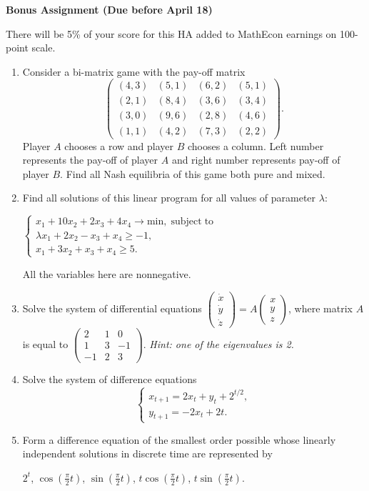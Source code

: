 \documentclass{article}
\begin{document}
\fontsize{14}{21}
\selectfont
\centerline{\textbf{Bonus Assignment (Due before April 18)}}
\fontsize{12}{18}
\selectfont

There will be 5\% of your score for this HA added to MathEcon earnings on 100-point scale.

\medskip

\begin{enumerate}
\item Consider a bi-matrix game with the pay-off matrix
$$
\begin{pmatrix}
(4,3) & (5,1) & (6,2) & (5,1)\\
(2,1) & (8,4) & (3,6) & (3,4)\\
(3,0) & (9,6) & (2,8) &(4,6)\\
(1,1) & (4,2) & (7,3) & (2,2)
\end{pmatrix}. $$
Player $A$ chooses a row and player $B$ chooses a column. Left number represents the pay-off of player $A$ and right number represents pay-off of player $B$. Find all Nash equilibria of this game both pure and mixed.

\item Find all solutions of this linear program for all values of parameter $\lambda$:

$
\begin{cases}
x_1+10x_2+2x_3+4x_4\rightarrow \mathrm{min,\; subject\; to}\\
\lambda x_1+2x_2-x_3+x_4\geqslant -1,\\
x_1+3x_2+x_3+x_4\geqslant 5.
\end{cases}
$

All the variables here are nonnegative.

\item Solve the system of differential equations $\begin{pmatrix}\dot x\\ \dot y \\ \dot z\end{pmatrix}=A\begin{pmatrix} x\\ y \\  z\end{pmatrix}$, where matrix $A$  is  equal to $\begin{pmatrix}2 &1 &0\\ 1 &3 &-1 \\ -1 & 2& 3\end{pmatrix}$. \textit{Hint: one of the eigenvalues is 2.}

\item Solve the system of difference equations $$\begin{cases}x_{t+1}=2x_t+y_t+2^{t/2},\\ y_{t+1}=-2x_t+2t.\end{cases}$$

\item Form a difference equation of the smallest order possible whose linearly independent solutions in discrete time are represented by 
    
    \centerline{$2^t$, $\cos \left(\frac {\pi}2t\right)$, $\sin \left(\frac {\pi}2t\right)$, $t\cos\left(\frac {\pi}2t\right)$, $t\sin\left(\frac {\pi}2t\right)$.}
\end{enumerate}
\end{document}
